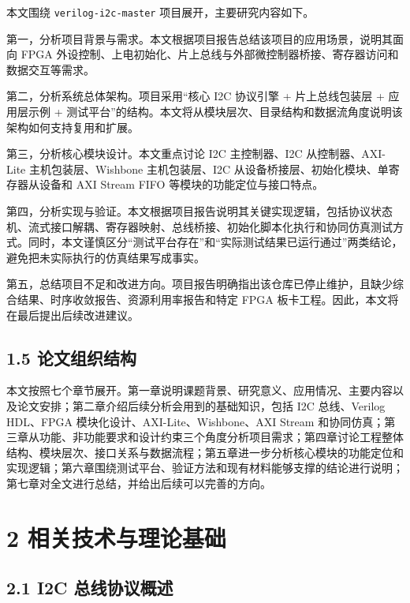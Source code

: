 本文围绕 \texttt{verilog-i2c-master} 项目展开，主要研究内容如下。

第一，分析项目背景与需求。本文根据项目报告总结该项目的应用场景，说明其面向 FPGA 外设控制、上电初始化、片上总线与外部微控制器桥接、寄存器访问和数据交互等需求。

第二，分析系统总体架构。项目采用``核心 I2C 协议引擎 + 片上总线包装层 + 应用层示例 + 测试平台''的结构。本文将从模块层次、目录结构和数据流角度说明该架构如何支持复用和扩展。

第三，分析核心模块设计。本文重点讨论 I2C 主控制器、I2C 从控制器、AXI-Lite 主机包装层、Wishbone 主机包装层、I2C 从设备桥接层、初始化模块、单寄存器从设备和 AXI Stream FIFO 等模块的功能定位与接口特点。

第四，分析实现与验证。本文根据项目报告说明其关键实现逻辑，包括协议状态机、流式接口解耦、寄存器映射、总线桥接、初始化脚本化执行和协同仿真测试方式。同时，本文谨慎区分``测试平台存在''和``实际测试结果已运行通过''两类结论，避免把未实际执行的仿真结果写成事实。

第五，总结项目不足和改进方向。项目报告明确指出该仓库已停止维护，且缺少综合结果、时序收敛报告、资源利用率报告和特定 FPGA 板卡工程。因此，本文将在最后提出后续改进建议。

\subsection{1.5 论文组织结构}\label{ux8bbaux6587ux7ec4ux7ec7ux7ed3ux6784}

本文按照七个章节展开。第一章说明课题背景、研究意义、应用情况、主要内容以及论文安排；第二章介绍后续分析会用到的基础知识，包括 I2C 总线、Verilog HDL、FPGA 模块化设计、AXI-Lite、Wishbone、AXI Stream 和协同仿真；第三章从功能、非功能要求和设计约束三个角度分析项目需求；第四章讨论工程整体结构、模块层次、接口关系与数据流程；第五章进一步分析核心模块的功能定位和实现逻辑；第六章围绕测试平台、验证方法和现有材料能够支撑的结论进行说明；第七章对全文进行总结，并给出后续可以完善的方向。

\section{2 相关技术与理论基础}\label{ux76f8ux5173ux6280ux672fux4e0eux7406ux8bbaux57faux7840}

\subsection{2.1 I2C 总线协议概述}\label{i2c-ux603bux7ebfux534fux8baeux6982ux8ff0}

